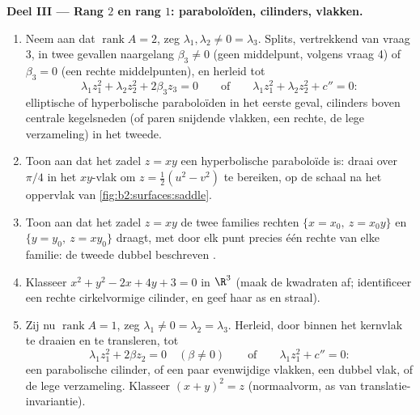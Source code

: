 \begin{problem}
\medskip
\noindent\textbf{Deel III --- Rang $2$ en rang $1$:
paraboloïden, cilinders, vlakken.}
\begin{enumerate}[resume]
  \item Neem aan dat $\operatorname{rank}A = 2$, zeg $\lambda_1,
        \lambda_2 \neq 0 = \lambda_3$. Splits, vertrekkend van
        vraag 3, in twee gevallen naargelang $\beta_3 \neq 0$
        (geen middelpunt, volgens vraag 4) of $\beta_3 = 0$ (een
        rechte middelpunten), en herleid tot
        \[
        \lambda_1z_1^2 + \lambda_2z_2^2 + 2\beta_3z_3 = 0
        \qquad\text{of}\qquad
        \lambda_1z_1^2 + \lambda_2z_2^2 + c'' = 0 :
        \]
        elliptische of hyperbolische paraboloïden in het eerste
        geval, cilinders boven centrale kegelsneden (of paren
        snijdende vlakken, een rechte, de lege verzameling) in het
        tweede.
  \item Toon aan dat het zadel $z = xy$ een hyperbolische
        paraboloïde is: draai over $\pi/4$ in het $xy$-vlak om $z
        = \tfrac12(u^2 - v^2)$ te bereiken, op de schaal na het
        oppervlak van \cref{fig:b2:surfaces:saddle}.
  \item Toon aan dat het zadel $z = xy$ de twee families rechten
        $\{x = x_0,\ z = x_0y\}$ en $\{y = y_0,\ z = xy_0\}$
        draagt, met door elk punt precies één rechte van elke
        familie: de tweede dubbel beschreven .
  \item Klasseer $x^2 + y^2 - 2x + 4y + 3 = 0$ in $\R^3$ (maak de
        kwadraten af; identificeer een rechte cirkelvormige
        cilinder, en geef haar as en straal).
  \item Zij nu $\operatorname{rank}A = 1$, zeg $\lambda_1 \neq 0 =
        \lambda_2 = \lambda_3$. Herleid, door binnen het kernvlak
        te draaien en te transleren, tot
        \[
        \lambda_1z_1^2 + 2\beta z_2 = 0 \quad (\beta \neq 0)
        \qquad\text{of}\qquad
        \lambda_1z_1^2 + c'' = 0 :
        \]
        een parabolische cilinder, of een paar evenwijdige
        vlakken, een dubbel vlak, of de lege verzameling.
        Klasseer $(x + y)^2 = z$  (normaalvorm, as van
        translatie-invariantie).
\end{enumerate}


\end{problem}
